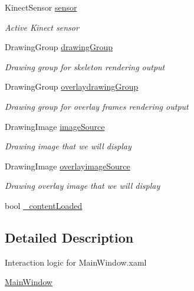 \begin{DoxyCompactItemize}
Kinect\-Sensor \hyperlink{classUTKinectSkeletonMovementDetector_1_1MainWindow_a12079fceab599014f7f11e5384617cee}{sensor}
\begin{DoxyCompactList}\small\item\em Active Kinect sensor \end{DoxyCompactList}\item 
Drawing\-Group \hyperlink{classUTKinectSkeletonMovementDetector_1_1MainWindow_a6d47dabfa57758770ec1b4772c95535a}{drawing\-Group}
\begin{DoxyCompactList}\small\item\em Drawing group for skeleton rendering output \end{DoxyCompactList}\item 
Drawing\-Group \hyperlink{classUTKinectSkeletonMovementDetector_1_1MainWindow_a6e11f78d0a9135efb206ecfcdbf0a17d}{overlaydrawing\-Group}
\begin{DoxyCompactList}\small\item\em Drawing group for overlay frames rendering output \end{DoxyCompactList}\item 
Drawing\-Image \hyperlink{classUTKinectSkeletonMovementDetector_1_1MainWindow_ad52ff16c5b6e893435ec7395a6c2d629}{image\-Source}
\begin{DoxyCompactList}\small\item\em Drawing image that we will display \end{DoxyCompactList}\item 
Drawing\-Image \hyperlink{classUTKinectSkeletonMovementDetector_1_1MainWindow_acea605090684467d3ae6c5df480c63f5}{overlayimage\-Source}
\begin{DoxyCompactList}\small\item\em Drawing overlay image that we will display \end{DoxyCompactList}\item 
bool \hyperlink{classUTKinectSkeletonMovementDetector_1_1MainWindow_ad0b36121811c03d7419565086eef94b4}{\-\_\-content\-Loaded}
\end{DoxyCompactItemize}


\subsection{Detailed Description}
Interaction logic for Main\-Window.\-xaml 

\hyperlink{classUTKinectSkeletonMovementDetector_1_1MainWindow}{Main\-Window} 

